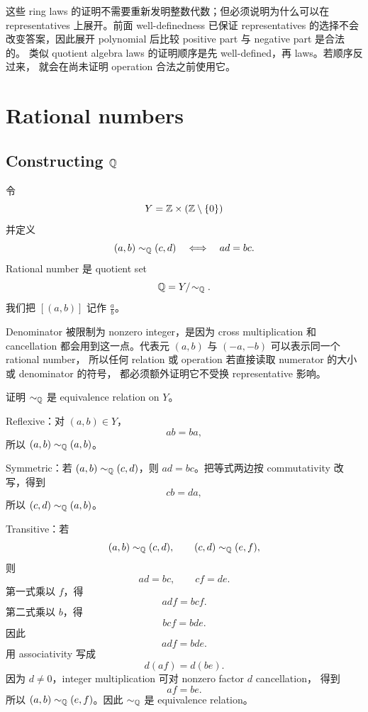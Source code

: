 \begin{explanation}
这些 ring laws 的证明不需要重新发明整数代数；但必须说明为什么可以在
representatives 上展开。前面 well-definedness 已保证 representatives 的选择不会
改变答案，因此展开 polynomial 后比较 positive part 与 negative part 是合法的。
类似 quotient algebra laws 的证明顺序是先 well-defined，再 laws。若顺序反过来，
就会在尚未证明 operation 合法之前使用它。
\end{explanation}

\section{Rational numbers}

\subsection{Constructing \texorpdfstring{\(\mathbb{Q}\)}{Q}}

令
\[
  Y=\mathbb{Z}\times(\mathbb{Z}\setminus\{0\})
\]
并定义
\[
  (a,b)\sim_{\mathbb{Q}}(c,d)\quad\Longleftrightarrow\quad ad=bc.
\]
Rational number 是 quotient set
\[
  \mathbb{Q}=Y/\!\sim_{\mathbb{Q}}.
\]
我们把 \([(a,b)]\) 记作 \(\frac ab\)。

Denominator 被限制为 nonzero integer，是因为 cross multiplication 和 cancellation
都会用到这一点。代表元 \((a,b)\) 与 \((-a,-b)\) 可以表示同一个 rational number，
所以任何 relation 或 operation 若直接读取 numerator 的大小或 denominator 的符号，
都必须额外证明它不受换 representative 影响。

\begin{exerciseblock}
证明 \(\sim_{\mathbb{Q}}\) 是 equivalence relation on \(Y\)。
\end{exerciseblock}

\begin{solution}
Reflexive：对 \((a,b)\in Y\)，
\[
  ab=ba,
\]
所以 \((a,b)\sim_{\mathbb{Q}}(a,b)\)。

Symmetric：若 \((a,b)\sim_{\mathbb{Q}}(c,d)\)，则 \(ad=bc\)。把等式两边按
commutativity 改写，得到
\[
  cb=da,
\]
所以 \((c,d)\sim_{\mathbb{Q}}(a,b)\)。

Transitive：若
\[
  (a,b)\sim_{\mathbb{Q}}(c,d),\qquad (c,d)\sim_{\mathbb{Q}}(e,f),
\]
则
\[
  ad=bc,\qquad cf=de.
\]
第一式乘以 \(f\)，得
\[
  adf=bcf.
\]
第二式乘以 \(b\)，得
\[
  bcf=bde.
\]
因此
\[
  adf=bde.
\]
用 associativity 写成
\[
  d(af)=d(be).
\]
因为 \(d\neq0\)，integer multiplication 可对 nonzero factor \(d\) cancellation，
得到
\[
  af=be.
\]
所以 \((a,b)\sim_{\mathbb{Q}}(e,f)\)。因此 \(\sim_{\mathbb{Q}}\) 是 equivalence relation。
\end{solution}

